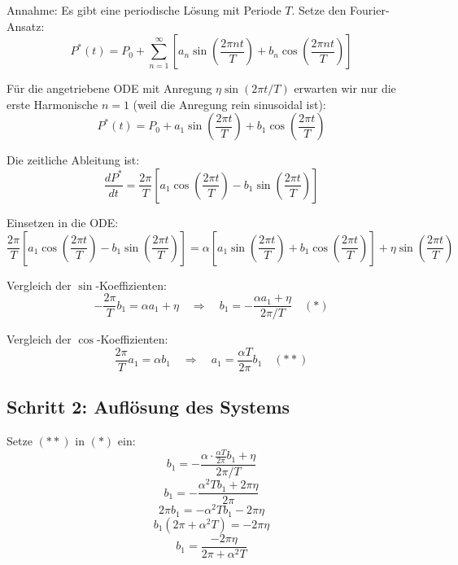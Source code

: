 \documentclass[a4paper, 12pt, twoside, openright]{report}
\theoremstyle{definition}
\theoremstyle{definition}
\begin{document}
Annahme: Es gibt eine periodische Lösung mit Periode $T$. Setze den Fourier-Ansatz:
\begin{equation}
    P^*(t) = P_0 + \sum_{n=1}^{\infty} \left[a_n \sin\left(\frac{2\pi n t}{T}\right) + b_n \cos\left(\frac{2\pi n t}{T}\right)\right]
\end{equation}

Für die angetriebene ODE mit Anregung $\eta \sin(2\pi t / T)$ erwarten wir nur die erste Harmonische $n=1$ (weil die Anregung rein sinusoidal ist):
\begin{equation}
    P^*(t) = P_0 + a_1 \sin\left(\frac{2\pi t}{T}\right) + b_1 \cos\left(\frac{2\pi t}{T}\right)
\end{equation}

Die zeitliche Ableitung ist:
\begin{equation}
    \frac{dP^*}{dt} = \frac{2\pi}{T}\left[a_1 \cos\left(\frac{2\pi t}{T}\right) - b_1 \sin\left(\frac{2\pi t}{T}\right)\right]
\end{equation}

Einsetzen in die ODE:
\begin{equation}
    \frac{2\pi}{T}\left[a_1 \cos\left(\frac{2\pi t}{T}\right) - b_1 \sin\left(\frac{2\pi t}{T}\right)\right] = \alpha\left[a_1 \sin\left(\frac{2\pi t}{T}\right) + b_1 \cos\left(\frac{2\pi t}{T}\right)\right] + \eta \sin\left(\frac{2\pi t}{T}\right)
\end{equation}

Vergleich der $\sin$-Koeffizienten:
\begin{equation}
    -\frac{2\pi}{T} b_1 = \alpha a_1 + \eta \quad \Rightarrow \quad b_1 = -\frac{\alpha a_1 + \eta}{2\pi/T} \quad (*)
\end{equation}

Vergleich der $\cos$-Koeffizienten:
\begin{equation}
    \frac{2\pi}{T} a_1 = \alpha b_1 \quad \Rightarrow \quad a_1 = \frac{\alpha T}{2\pi} b_1 \quad (**)
\end{equation}

\subsection{Schritt 2: Auflösung des Systems}

Setze $(**)$ in $(*)$ ein:
\begin{equation}
    b_1 = -\frac{\alpha \cdot \frac{\alpha T}{2\pi} b_1 + \eta}{2\pi/T}
\end{equation}
\begin{equation}
    b_1 = -\frac{\alpha^2 T b_1 + 2\pi \eta}{2\pi}
\end{equation}
\begin{equation}
    2\pi b_1 = -\alpha^2 T b_1 - 2\pi \eta
\end{equation}
\begin{equation}
    b_1(2\pi + \alpha^2 T) = -2\pi \eta
\end{equation}
\begin{equation}
    b_1 = \frac{-2\pi \eta}{2\pi + \alpha^2 T}
\end{equation}
\end{document}
